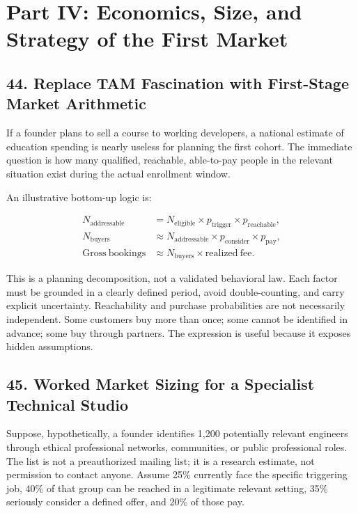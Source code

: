 \section*{Part IV: Economics, Size, and Strategy of the First Market}

\subsection*{44. Replace TAM Fascination with First-Stage Market Arithmetic}

If a founder plans to sell a course to working developers, a national estimate of education spending is nearly useless for planning the first cohort. The immediate question is how many qualified, reachable, able-to-pay people in the relevant situation exist during the actual enrollment window.

An illustrative bottom-up logic is:

\begin{equation}
\begin{aligned}
N_{\mathrm{addressable}} &= N_{\mathrm{eligible}} \times p_{\mathrm{trigger}} \times p_{\mathrm{reachable}}, \\
N_{\mathrm{buyers}} &\approx N_{\mathrm{addressable}} \times p_{\mathrm{consider}} \times p_{\mathrm{pay}}, \\
\mathrm{Gross\ bookings} &\approx N_{\mathrm{buyers}} \times \mathrm{realized\ fee}.
\end{aligned}
\end{equation}

This is a planning decomposition, not a validated behavioral law. Each factor must be grounded in a clearly defined period, avoid double-counting, and carry explicit uncertainty. Reachability and purchase probabilities are not necessarily independent. Some customers buy more than once; some cannot be identified in advance; some buy through partners. The expression is useful because it exposes hidden assumptions.

\subsection*{45. Worked Market Sizing for a Specialist Technical Studio}

Suppose, hypothetically, a founder identifies 1,200 potentially relevant engineers through ethical professional networks, communities, or public professional roles. The list is not a preauthorized mailing list; it is a research estimate, not permission to contact anyone. Assume 25\% currently face the specific triggering job, 40\% of that group can be reached in a legitimate relevant setting, 35\% seriously consider a defined offer, and 20\% of those pay.


